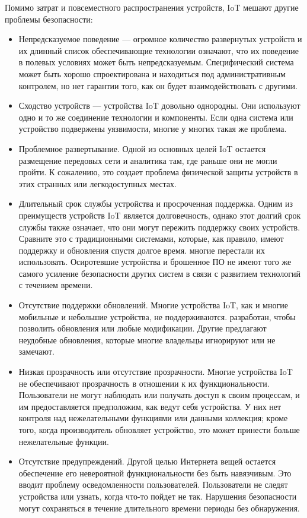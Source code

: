 Помимо затрат и повсеместного распространения устройств, IoT мешают другие проблемы безопасности:
\begin{itemize}
    \item Непредсказуемое поведение — огромное количество развернутых устройств и их длинный список
    обеспечивающие технологии означают, что их поведение в полевых условиях может быть непредсказуемым. Специфический
    система может быть хорошо спроектирована и находиться под административным контролем, но нет
    гарантии того, как он будет взаимодействовать с другими.

    \item Сходство устройств — устройства IoT довольно однородны. Они используют одно и то же соединение
    технологии и компоненты. Если одна система или устройство подвержены уязвимости, многие
    у многих такая же проблема.

    \item Проблемное развертывание. Одной из основных целей IoT остается размещение передовых
    сети и аналитика там, где раньше они не могли пройти. К сожалению, это создает
    проблема физической защиты устройств в этих странных или легкодоступных местах.
    
    \item Длительный срок службы устройства и просроченная поддержка. Одним из преимуществ устройств IoT является
    долговечность, однако этот долгий срок службы также означает, что они могут пережить поддержку своих устройств.
    Сравните это с традиционными системами, которые, как правило, имеют поддержку и обновления спустя долгое время.
    многие перестали их использовать. Осиротевшие устройства и брошенное ПО не имеют того же самого
    усиление безопасности других систем в связи с развитием технологий с течением времени.
    
    \item Отсутствие поддержки обновлений. Многие устройства IoT, как и многие мобильные и небольшие устройства, не поддерживаются.
    разработан, чтобы позволить обновления или любые модификации. Другие предлагают неудобные обновления,
    которые многие владельцы игнорируют или не замечают.
    
    \item Низкая прозрачность или отсутствие прозрачности. Многие устройства IoT не обеспечивают прозрачность в отношении
    к их функциональности. Пользователи не могут наблюдать или получать доступ к своим процессам, и им предоставляется
    предположим, как ведут себя устройства. У них нет контроля над нежелательными функциями или данными
    коллекция; кроме того, когда производитель обновляет устройство, это может принести больше
    нежелательные функции.
    
    \item Отсутствие предупреждений. Другой целью Интернета вещей остается обеспечение его невероятной функциональности без
    быть навязчивым. Это вводит проблему осведомленности пользователей. Пользователи не следят
    устройства или узнать, когда что-то пойдет не так. Нарушения безопасности могут сохраняться в течение длительного времени
    периоды без обнаружения.
\end{itemize}